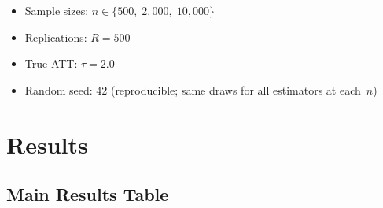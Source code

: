 \documentclass[11pt,letterpaper]{article}
\begin{document}
\begin{itemize}[nosep]
  \item Sample sizes: $n \in \{500,\; 2{,}000,\; 10{,}000\}$
  \item Replications: $R = 500$
  \item True ATT: $\tau = 2.0$
  \item Random seed: 42 (reproducible; same draws for all estimators at each~$n$)
\end{itemize}


\section{Results}

\subsection{Main Results Table}
\end{document}
